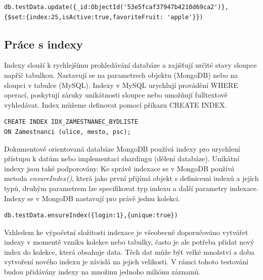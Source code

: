 \begin{lstlisting}[caption={Ukázka editace záznamu za pomocí operátoru \$set v MongoDB}]
db.testData.update({_id:ObjectId('53e5fcaf37947b4210d69ca2')},
{$set:{index:25,isActive:true,favoriteFruit: 'apple'}})
\end{lstlisting}

\subsection{Práce s indexy}
Indexy slouží k rychlejšímu prohledávání databáze a zajišťují určité stavy sloupce napříč tabulkou. Nastavují se na parametrech objektu (MongoDB) nebo na sloupci v tabulce (MySQL). Indexy v MySQL urychlují provádění WHERE operací, poskytují záruky unikátnosti sloupce nebo umožňují fulltextově vyhledávat. Index můžeme definovat pomocí příkazu CREATE INDEX.

\begin{lstlisting}[caption={Ukázka vytvoření indexu v MySQL}]
CREATE INDEX IDX_ZAMESTNANEC_BYDLISTE
ON Zamestnanci (ulice, mesto, psc); 
\end{lstlisting}

Dokumentově orientovaná databáze MongoDB používá indexy pro urychlení přístupu k datům nebo implementaci shardingu (dělení databáze). Unikátní indexy jsou také podporovány. Ke správě indexace se v MongoDB používá metoda \emph{ensureIndex()}, která jako první přijímá objekt s definicemi indexů a jejich typů, druhým parametrem lze specifikovat typ indexu a další parametry indexace. Indexy se v MongoDB nastavují pro právě jednu kolekci.

\begin{lstlisting}[caption={Ukázka vytvoření unikátního indexu pro login v MongoDB}]
db.testData.ensureIndex({login:1},{unique:true})
\end{lstlisting}

Vzhledem ke výpočetní složitosti indexace je všeobecně doporučováno vytvářet indexy v momentě vzniku kolekce nebo tabulky, často je ale potřeba přidat nový index do kolekce,
která obsahuje data. Těch dat může být velké množství a doba vytvoření nového indexu je závislá na jejich velikosti. V rámci tohoto testování budou přidávány indexy na množinu jednoho miliónu záznamů. 

